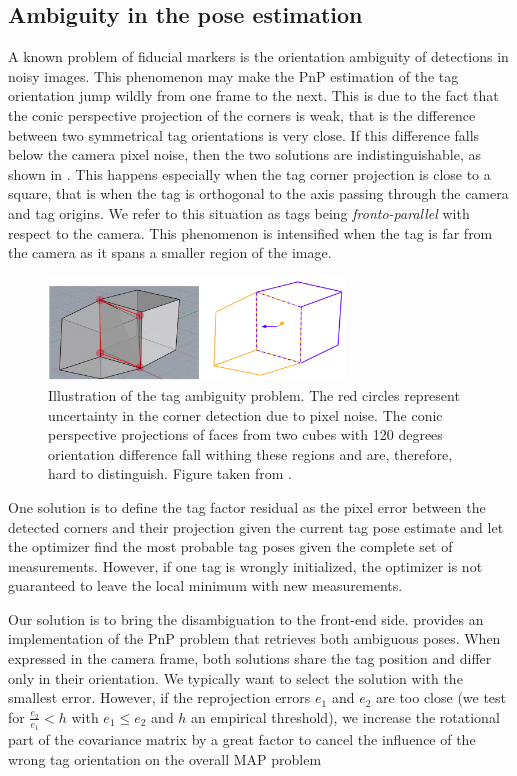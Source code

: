 \subsection{Ambiguity in the pose estimation}
\label{sec:tag_ambiguity}

A known problem of fiducial markers is the orientation ambiguity of detections in noisy images. This phenomenon may make the PnP estimation of the 
tag orientation jump wildly from one frame to the next. This is due to the fact that the conic perspective projection of the corners is weak, 
that is the difference between two symmetrical tag orientations is very close. If this difference falls below the camera pixel noise, 
then the two solutions are indistinguishable, as shown in . This happens especially when the tag corner projection is 
close to a square, that is when the tag is orthogonal to the axis passing through the camera and tag origins. 
We refer to this situation as tags being \textit{fronto-parallel} with respect to the camera.
This phenomenon is intensified when the tag is far from the camera as it spans a smaller region of the image. 

\begin{figure}
    \centering
    \includegraphics[width=0.7\textwidth]{figures/tag_ambiguity.png}
    \caption{Illustration of the tag ambiguity problem. The red circles represent uncertainty in the corner detection due to pixel noise. 
    The conic perspective projections of faces from two cubes with 120 degrees orientation difference fall withing these regions and are, therefore, 
    hard to distinguish. Figure taken from \cite{8206468}.}
    \label{fig:tag_ambiguity}
\end{figure}

One solution is to define the tag factor residual as the pixel error between the detected corners and their projection given the
current tag pose estimate and let the optimizer find the most probable tag poses given the complete set of measurements. However, if one tag is wrongly initialized, 
the optimizer is not guaranteed to leave the local minimum with new measurements. 

Our solution is to bring the disambiguation to the front-end side.
\cite{collins2014infinitesimal} provides an implementation of the PnP problem that retrieves both ambiguous poses. When expressed in the camera frame, 
both solutions share the tag position and differ only in their orientation. We typically want to select the solution with the smallest error. 
However, if the reprojection errors $e_1$ and $e_2$ are too close (we test for $\tfrac{e_2}{e_1} < h$ with $e_1 \leq e_2$ and $h$ an empirical threshold), 
we increase the rotational part of the covariance matrix by a great factor to cancel the influence of the wrong tag orientation on the 
overall MAP problem

